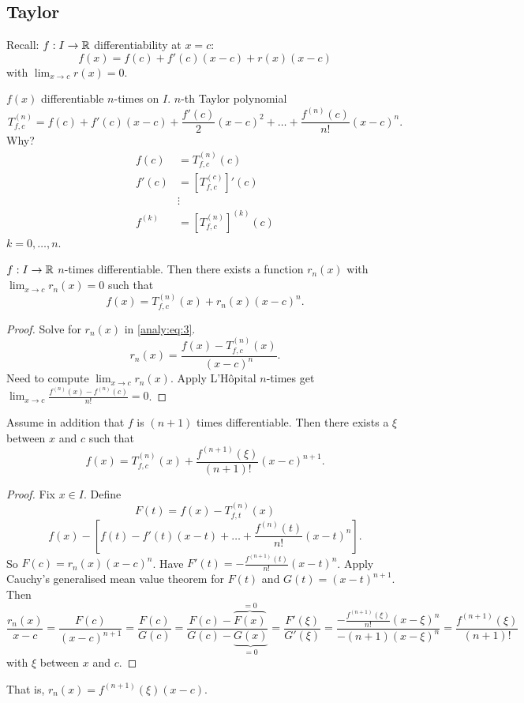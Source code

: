 \documentclass[10pt, a4paper]{article}
\begin{document}
\subsection{Taylor}

Recall:
$f : I \to \mathbb{R}$ differentiability at $x = c$:
\[
f(x) = f(c) + f'(c)(x - c) + r(x)(x - c)
\]
with $\lim_{x \to c}r(x) = 0$.

$f(x)$ differentiable $n$-times on $I$.
$n$-th Taylor polynomial
\[
T_{f, c} ^ {(n)} = f(c) + f'(c)(x - c) + \frac{f'(c)}{2}(x - c) ^ 2 + \dotsc + \frac{f ^ {(n)}(c)}{n!}(x - c) ^ n.
\]
Why?
\begin{align*}
    f(c) &= T_{f, c} ^ {(n)}(c) \\
    f'(c) &= \left[T_{f, c} ^ {(c)}\right]'(c) \\
    &\vdots \\
    f ^ {(k)} &= \left[T_{f, c} ^ {(n)}\right] ^ {(k)}(c)
\end{align*}
$k = 0, \dotsc, n$.

\begin{theorem}
    $f : I \to \mathbb{R}$ $n$-times differentiable.
    Then there exists a function $r_n(x)$ with $\lim_{x \to c}r_n(x) = 0$ such that
    \begin{equation}\label{analy:eq:3}
        f(x) = T_{f, c} ^ {(n)}(x) + r_n(x)(x - c) ^ n.
    \end{equation}

    \begin{proof}
        Solve for $r_n(x)$ in \eqref{analy:eq:3}.
        \[
        r_n(x) = \frac{f(x) - T_{f, c} ^{(n)}(x)}{(x - c) ^ n}.
        \]
        Need to compute $\lim_{x \to c}r_n(x)$.
        Apply L'H\^opital $n$-times get $\lim_{x \to c}\frac{f ^ {(n)}(x) - f ^ {(n)}(c)}{n!} = 0$.
    \end{proof}
\end{theorem}

\begin{theorem}
    Assume in addition that $f$ is $(n + 1)$ times differentiable.
    Then there exists a $\xi$ between $x$ and $c$ such that
    \[
    f(x) = T_{f, c} ^ {(n)}(x) + \frac{f ^ {(n + 1)}(\xi)}{(n + 1)!}(x - c) ^ {n + 1}.
    \]

    \begin{proof}
        Fix $x \in I$.
        Define
        \[
        F(t) = f(x) - T_{f, t} ^ {(n)}(x)
        \]
        \[
        f(x) - \left[f(t) - f'(t)(x - t) + \dotsc + \frac{f ^ {(n)}(t)}{n!}(x - t) ^ n\right].
        \]
        So $F(c) = r_n(x)(x - c) ^ n$.
        Have $F'(t) = -\frac{f ^ {(n + 1)}(t)}{n!}(x - t) ^ n$.
        Apply Cauchy's generalised mean value theorem for $F(t)$ and $G(t) = (x - t) ^ {n + 1}$.
        Then
        \[
        \frac{r_n(x)}{x - c} = \frac{F(c)}{(x - c) ^ {n + 1}} = \frac{F(c)}{G(c)} = \frac{F(c) - \overbrace{F(x)}^{= 0}}{G(c) - \underbrace{G(x)}_{= 0}} = \frac{F'(\xi)}{G'(\xi)} = \frac{{-\frac{f ^ {(n + 1)}(\xi)}{n!}(x - \xi) ^ n}}{-(n + 1)(x - \xi) ^ n} = \frac{f ^ {(n + 1)}(\xi)}{(n + 1)!}
        \]
        with $\xi$ between $x$ and $c$.
    \end{proof}
\end{theorem}
That is,
$r_n(x) = f ^ {(n + 1)}(\xi)(x - c)$.
\end{document}

